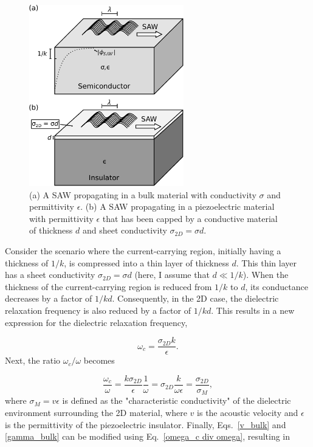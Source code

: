 \documentclass{beavtex_dub_edit}
\begin{document}
\begin{figure}
    \includegraphics[width = 0.6\textwidth]{SAW in thin film.pdf}
    \caption{(a) A SAW propagating in a bulk material with conductivity $\sigma$ and permittivity $\epsilon$. (b) A SAW propagating in a piezoelectric material with permittivity $\epsilon$ that has been capped by a conductive material of thickness $d$ and sheet conductivity $\sigma_{2D} = \sigma d$.}
    \label{SAW in thin film}
\end{figure}

Consider the scenario where the current-carrying region, initially having a thickness of $1/k$, is compressed into a thin layer of thickness $d$. This thin layer has a sheet conductivity $\sigma_{2D} = \sigma d$ (here, I assume that $d \ll 1/k$). When the thickness of the current-carrying region is reduced from $1/k$ to $d$, its conductance decreases by a factor of $1/kd$. Consequently, in the 2D case, the dielectric relaxation frequency is also reduced by a factor of $1/kd$. This results in a new expression for the dielectric relaxation frequency, 

\begin{equation}
    \omega_c = \frac{\sigma_{2D}k}{\epsilon}.
\end{equation}
Next, the ratio $\omega_c/\omega$ becomes

\begin{equation}
    \frac{\omega_c}{\omega} = \frac{k\sigma_{2D}}{\epsilon}\frac{1}{\omega} = \sigma_{2D}\frac{k}{\omega \epsilon} = \frac{\sigma_{2D}}{\sigma_M}, \label{omega_c div omega}
\end{equation}
where $\sigma_M = v \epsilon$ is defined as the "characteristic conductivity" of the dielectric environment surrounding the 2D material, where $v$ is the acoustic velocity and $\epsilon$ is the permittivity of the piezoelectric insulator. Finally, Eqs.\ \ref{v_bulk} and \ref{gamma_bulk} can be modified using Eq.\ \ref{omega_c div omega}, resulting in 
\end{document}
